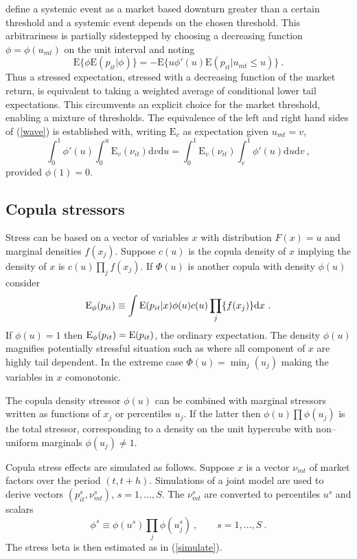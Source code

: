 \documentclass[authoryear]{elsarticle}
\newcommand{\E}{\mathrm{E}}
\newcommand{\de}{\mathrm{d}}
\newcommand{\eref}[1]{(\ref{#1})}
\newcommand{\cq}{\ , \qquad}
\newcommand{\be}[1]{\begin{equation}\label{#1}}
\newcommand{\ee}{\end{equation}}
\begin{document}
\cite{brownlees2015} define a systemic event as a market based downturn greater than a certain threshold and a systemic event  depends on the chosen threshold.   This arbitrariness is partially sidestepped by choosing a decreasing function $\phi=\phi(u_{mt})$ on the unit interval and noting 
\be{wave}
\E\{\phi\E(p_{it}|\phi)\} = -\E\{u\phi'(u)\E(p_{it}|u_{mt}\le u)\}\ .
\ee
Thus a stressed expectation, stressed with a decreasing function of the market return, is equivalent to taking a weighted average of conditional lower tail expectations.  This circumvents an explicit choice for the market threshold, enabling a mixture of thresholds.  The equivalence of the left and right hand sides of \eref{wave}  is established with, writing $\E_v$ as expectation given $u_{mt}=v$,  
$$
\int_0^1 \phi'(u)  \int_0^u \E_v(\nu_{it})\de v   \de u =\int_0^1\E_v(\nu_{it})\int_v^1  \phi'(u) \de u \de v\ ,   
$$
provided $\phi(1)=0$.

\subsection{Copula stressors}


Stress can be based on a vector of variables $x$ with distribution $F(x)=u$ and marginal densities $f(x_j)$.    Suppose $c(u)$ is the copula density of $x$ implying the density of $x$ is $c(u)\prod_jf(x_j)$.    If  $\Phi(u)$ is another copula with density $\phi(u)$ 
consider
\be{copula}
\Es(p_{it}) \equiv \int \E(p_{it}|x)\phi(u)c(u)\prod_j\{f(x_j)\}  \de x   \ .
\ee
If $\phi(u)=1$  then $\Es(p_{it})=\E(p_{it})$, the ordinary expectation.   The density $\phi(u)$ magnifies potentially stressful situation such as where all component of $x$ are highly  tail dependent.     In the extreme case  $\Phi(u)=\min_j(u_j)$ making the  variables in $x$  comonotonic. 

The copula density stressor $\phi(u)$  can be combined with marginal stressors written as functions of $x_j$ or  percentiles $u_j$.  If the latter then $\phi(u)\prod\phi(u_j)$ is the total stressor, corresponding to a density on the unit hypercube with non--uniform marginals  $\phi(u_j)\ne 1$. 
  
Copula stress effects are simulated as follows.   Suppose $x$ is a vector $\nu_{mt}$ of  market factors  over the period $(t,t+h)$.   Simulations of a joint model are  used to  derive  vectors $(p_{it}^s,\nu_{mt}^s)$, $ s=1,\ldots, S$.  The $\nu_{mt}^s$ are  converted to percentiles $u^s$ and scalars 
$$
\phi^s\equiv\phi(u^s)\prod_j\phi(u_j^s)\cq s=1,\ldots, S\ .
$$
The stress beta is then estimated as in \eref{simulate}.
\end{document}
